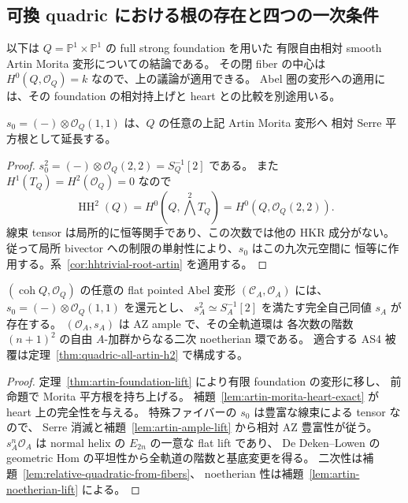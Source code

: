 \subsection{可換 quadric における根の存在と四つの一次条件}

以下は $Q=\mathbb P^1\times\mathbb P^1$ の full strong foundation を用いた
有限自由相対 smooth Artin Morita 変形についての結論である。
その閉 fiber の中心は $H^0(Q,\mathcal O_Q)=k$ なので、上の議論が適用できる。
Abel 圏の変形への適用には、その foundation の相対持上げと
heart との比較を別途用いる。

\begin{proposition}
\label{prop:quadric-root-all-artin}
$s_0=(-)\otimes\mathcal O_Q(1,1)$ は、$Q$ の任意の上記 Artin Morita 変形へ
相対 Serre 平方根として延長する。
\end{proposition}
\begin{proof}
$s_0^2=(-)\otimes\mathcal O_Q(2,2)=S_Q^{-1}[2]$ である。
また $H^1(T_Q)=H^2(\mathcal O_Q)=0$ なので
\[
 \operatorname{HH}^2(Q)=H^0(Q,\textstyle\bigwedge^2T_Q)
                     =H^0(Q,\mathcal O_Q(2,2)).
\]
線束 tensor は局所的に恒等関手であり、この次数では他の HKR 成分がない。
従って局所 bivector への制限の単射性により、$s_0$ はこの九次元空間に
恒等に作用する。系~\ref{cor:hhtrivial-root-artin} を適用する。
\end{proof}

\begin{corollary}
\label{cor:quadric-exact-root-all-artin}
$(\operatorname{coh}Q,\mathcal O_Q)$ の任意の flat pointed Abel 変形
$(\mathcal C_A,\mathcal O_A)$ には、$s_0=(-)\otimes\mathcal O_Q(1,1)$ を還元とし、
$s_A^2\simeq S_A^{-1}[2]$ を満たす完全自己同値 $s_A$ が存在する。
$(\mathcal O_A,s_A)$ は AZ ample で、その全軌道環は
各次数の階数 $(n+1)^2$ の自由 $A$-加群からなる二次 noetherian 環である。
適合する AS4 被覆は定理~\ref{thm:quadric-all-artin-h2} で構成する。
\end{corollary}
\begin{proof}
定理~\ref{thm:artin-foundation-lift} により有限 foundation の変形に移し、
前命題で Morita 平方根を持ち上げる。
補題~\ref{lem:artin-morita-heart-exact} が heart 上の完全性を与える。
特殊ファイバーの $s_0$ は豊富な線束による tensor なので、
Serre 消滅と補題~\ref{lem:artin-ample-lift} から相対 AZ 豊富性が従う。
$s_A^n\mathcal O_A$ は normal helix の $E_{2n}$ の一意な flat lift であり、
De Deken--Lowen の geometric Hom の平坦性から全軌道の階数と基底変更を得る。
二次性は補題~\ref{lem:relative-quadratic-from-fibers}、
noetherian 性は補題~\ref{lem:artin-noetherian-lift} による。
\end{proof}

